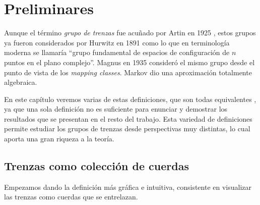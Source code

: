 \documentclass[TFG.tex]{subfiles}
\begin{document}
\chapter{Preliminares}

Aunque el término \emph{grupo de trenzas} fue acuñado por Artin en 1925 \cite{ArtinA}, estos grupos ya fueron considerados por Hurwitz en 1891 \cite{Hur} como lo que en terminología moderna se llamaría ``grupo fundamental de espacios de configuración de $n$ puntos en el plano complejo''. Magnus en 1935 \cite{Magnus} consideró el mismo grupo desde el punto de vista de los \emph{mapping classes}. Markov \cite{Markoff} dio una aproximación totalmente algebraica. 

En este capítulo veremos varias de estas definiciones, que son todas equivalentes \cite{Zariski}, ya que una sola definición no es suficiente para enunciar y demostrar los resultados que se presentan en el resto del trabajo. Esta variedad de definiciones permite estudiar los grupos de trenzas desde perspectivas muy distintas, lo cual aporta una gran riqueza a la teoría.


\section{Trenzas como colección de cuerdas}
Empezamos dando la definición más gráfica e intuitiva, consistente en visualizar las trenzas como cuerdas que se entrelazan. 
\end{document}
